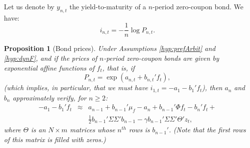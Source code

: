 \documentclass[
  12pt,
]{book}
\newtheorem{proposition}{Proposition}[chapter]
\theoremstyle{definition}
\theoremstyle{definition}
\theoremstyle{definition}
\theoremstyle{definition}
\theoremstyle{remark}
\begin{document}
Let us denote by \(y_{n,t}\) the yield-to-maturity of a \(n\)-period zero-coupon bond. We have:
\begin{equation}
i_{n,t} = - \frac{1}{n}\log P_{n,t}.\label{eq:Pandy}
\end{equation}

\begin{proposition}[Bond prices]
\protect\hypertarget{prp:prop111}{}\label{prp:prop111}Under Assumptions \ref{hyp:prefArbit} and \ref{hyp:dynF}, and if the prices of \(n\)-period zero-coupon bonds are given by exponential affine functions of \(f_t\), that is, if
\begin{equation}
P_{n,t} = \exp(a_{n,t} + b_{n,t}'f_t), \label{eq:PPs}    
\end{equation}
(which implies, in particular, that we must have \(i_{1,t} = - a_1 - b_1'f_t\)), then \(a_n\) and \(b_n\) approximately verify, for \(n \ge 2\):
\begin{eqnarray}
-a_1-b_1' f_t &\approx& a_{n-1} + b_{n-1}'\mu_f  - a_{n} + b_{n-1}'\Phi f_t - b_{n}'f_{t} + \nonumber \\ &&\frac{1}{2}b_{n-1}'\Sigma \Sigma'b_{n-1} - \gamma b_{n-1}'\Sigma\Sigma'\Theta' z_t, \label{eq:Lagr1B}
\end{eqnarray}
where \(\Theta\) is an \(N \times m\) matrices whose \(n^{th}\) rows is \(b_{n-1}'\). (Note that the first rows of this matrix is filled with zeros.)
\end{proposition}
\end{document}
